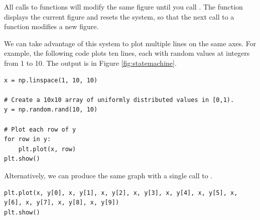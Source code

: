 All calls to  functions will modify the same figure until you call . 
The function  displays the current figure and resets the system, so that the next call to a  function modifies a new figure. 

We can take advantage of this system to plot multiple lines on the same axes.
For example, the following code plots ten lines, each with random values at integers from 1 to 10. 
The output is in Figure \ref{fig:statemachine}.
\begin{lstlisting}
x = np.linspace(1, 10, 10)

# Create a 10x10 array of uniformly distributed values in [0,1).
y = np.random.rand(10, 10)

# Plot each row of y
for row in y:
    plt.plot(x, row)
plt.show()
\end{lstlisting}

Alternatively, we can produce the same graph with a single call to .
\begin{lstlisting}
plt.plot(x, y[0], x, y[1], x, y[2], x, y[3], x, y[4], x, y[5], x, y[6], x, y[7], x, y[8], x, y[9])
plt.show()
\end{lstlisting}


